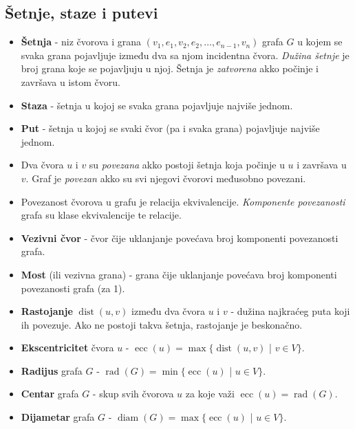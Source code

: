 \documentclass[a4paper,12pt,twoside]{report}
\numberwithin{algorithm}{section}
\begin{document}
\subsection{Šetnje, staze i putevi}
\begin{itemize}
    \item \textbf{Šetnja} - niz čvorova i grana $(v_1, e_1, v_2, e_2, \ldots, e_{n-1}, v_n)$ grafa $G$ u kojem se svaka grana pojavljuje između dva sa njom incidentna čvora. \textit{Dužina šetnje} je broj grana koje se pojavljuju u njoj. Šetnja je \textit{zatvorena} akko počinje i završava u istom čvoru.
    \item \textbf{Staza} - šetnja u kojoj se svaka grana pojavljuje najviše jednom. 
    \item \textbf{Put} - šetnja u kojoj se svaki čvor (pa i svaka grana) pojavljuje najviše jednom.
    \item Dva čvora $u$ i $v$ su \textit{povezana} akko postoji šetnja koja počinje u $u$ i završava u $v$. Graf je \textit{povezan} akko su svi njegovi čvorovi međusobno povezani.
    \item Povezanost čvorova u grafu je relacija ekvivalencije. \textit{Komponente povezanosti} grafa su klase ekvivalencije te relacije.
    \item \textbf{Vezivni čvor} - čvor čije uklanjanje povećava broj komponenti povezanosti grafa.
    \item \textbf{Most} (ili vezivna grana) - grana čije uklanjanje povećava broj komponenti povezanosti grafa (za 1).
    \item \textbf{Rastojanje} $\operatorname{dist}(u, v)$ između dva čvora $u$ i $v$ - dužina najkraćeg puta koji ih povezuje. Ako ne postoji takva šetnja, rastojanje je beskonačno.
    \item \textbf{Ekscentricitet} čvora $u$ - $\operatorname{ecc}(u) = \max \{ \operatorname{dist}(u, v)$ | $v \in V \}$.
    \item \textbf{Radijus} grafa $G$ - $\operatorname{rad}(G) = \min \{ \operatorname{ecc}(u)$ | $u \in V \}$.
    \item \textbf{Centar} grafa $G$ - skup svih čvorova $u$ za koje važi $\operatorname{ecc}(u) = \operatorname{rad}(G)$.
    \item \textbf{Dijametar} grafa $G$ - $\operatorname{diam}(G) = \max \{ \operatorname{ecc}(u)$ | $u \in V \}$.
\end{itemize}
\end{document}
